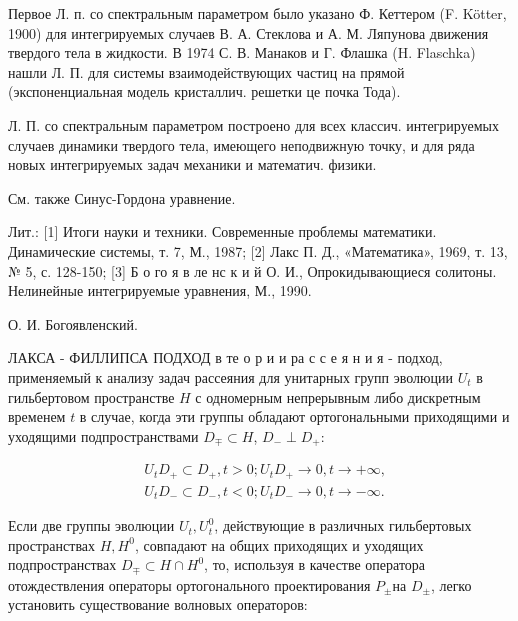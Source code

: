 \documentclass[10pt]{article}
\begin{document}
Первое Л. п. со спектральным параметром было указано Ф. Кеттером (F. Kötter, 1900) для интегрируемых случаев В. А. Стеклова и А. М. Ляпунова движения твердого тела в жидкости. В 1974 С. В. Манаков и Г. Флашка (H. Flaschka) нашли Л. П. для системы взаимодействующих частиц на прямой (экспоненциальная модель кристаллич. решетки це почка Тода).



Л. П. со спектральным параметром построено для всех классич. интегрируемых случаев динамики твердого тела, имеющего неподвижную точку, и для ряда новых интегрируемых задач механики и математич. физики.



См. также Синус-Гордона уравнение.



Лит.: [1] Итоги науки и техники. Современные проблемы математики. Динамические системы, т. 7, М., 1987; [2] Лакс П. Д., «Математика», 1969, т. 13, № 5, с. 128-150; [3] Б о го я в ле нс к и й О. И., Опрокидывающиеся солитоны. Нелинейные интегрируемые уравнения, М., 1990.



О. И. Богоявленский.



ЛАКСА - ФИЛЛИПСА ПОДХОД в те о р и и ра с с е я н и я - подход, применяемый к анализу задач рассеяния для унитарных групп эволюции $U_{t}$ в гильбертовом пространстве $H$ с одномерным непрерывным либо дискретным временем $t$ в случае, когда эти группы обладают ортогональными приходящими и уходящими подпространствами $D_{\mp} \subset H$, $D_{-} \perp D_{+}:$



\[

\begin{aligned}

& U_{t} D_{+} \subset D_{+}, t>0 ; U_{t} D_{+} \rightarrow 0, t \rightarrow+\infty, \\

& U_{t} D_{-} \subset D_{-}, t<0 ; U_{t} D_{-} \rightarrow 0, t \rightarrow-\infty .

\end{aligned}

\]



Если две группы эволюции $U_{t}, U_{t}^{0}$, действующие в различных гильбертовых пространствах $H, H^{0}$, совпадают на общих приходящих и уходящих подпространствах $D_{\mp} \subset H \cap H^{0}$, то, используя в качестве оператора отождествления операторы ортогонального проектирования $P_{ \pm}$на $D_{ \pm}$, легко установить существование волновых операторов:
\end{document}
